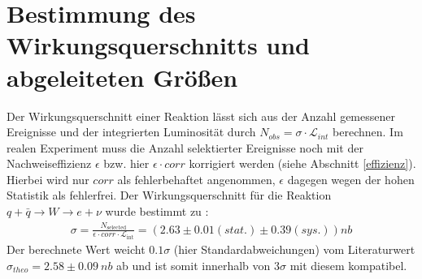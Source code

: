 \documentclass[a4paper,12pt]{article}
\begin{document}
\section{Bestimmung des Wirkungsquerschnitts und abgeleiteten Größen}
Der Wirkungsquerschnitt einer Reaktion lässt sich aus der Anzahl gemessener Ereignisse und der
integrierten Luminosität durch $N_{obs}=\sigma \cdot \mathcal{L}_{int}$ berechnen. Im realen Experiment
muss die Anzahl selektierter Ereignisse noch mit der Nachweiseffizienz $\epsilon$ bzw. hier $\epsilon \cdot corr$
korrigiert werden (siehe Abschnitt \ref{effizienz}).
Hierbei wird nur $corr$ als fehlerbehaftet angenommen, $\epsilon$ dagegen wegen der hohen Statistik
als fehlerfrei. Der Wirkungsquerschnitt für die Reaktion $q+\bar{q}\rightarrow W \rightarrow e+ \nu$ wurde bestimmt zu :
\begin{align*}
	\sigma = \frac{N_\text{selected}}{\epsilon \cdot corr \cdot \mathcal{L}_\text{int}} = ( 2.63 ± 0.01 (stat.) ± 0.39(sys.)) \si{nb}
\end{align*}
Der berechnete Wert weicht $0.1\sigma$ (hier Standardabweichungen) vom Literaturwert $\sigma_{theo}=2.58 \pm \SI{0.09}{nb}$
\cite{versuchsanleitung} ab und ist somit innerhalb von $ 3\sigma$ mit diesem kompatibel.
\end{document}

